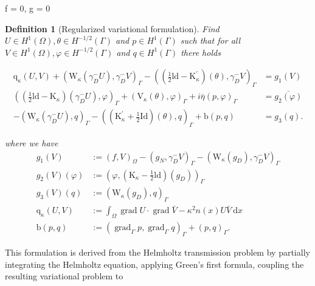 \documentclass[10pt,journal,compsoc, onecolumn]{IEEEtran}
\newtheorem{definition}[theorem]{Definition}
\begin{document}
f = 0, g = 0
\newpage
\begin{definition}[Regularized variational formulation]
    Find \(U \in H^{1}(\Omega), \theta \in H^{-1 / 2}(\Gamma)\) and \(p \in H^{1}(\Gamma)\) such that for all \(V \in H^{1}(\Omega), \varphi \in H^{-1 / 2}(\Gamma)\)
    and \(q \in H^{1}(\Gamma)\) there holds

    \begin{align}
        \mathrm{q}_{\kappa}(U, V)+\left(\mathrm{W}_{\kappa}\left(\gamma_{D}^{-} U\right), \gamma_{D}^{-} V\right)_{\Gamma}-\left((\frac{1}{2} \mathrm{ld}-\mathrm{K}_{\kappa}^{\prime})(\theta), \gamma_{D}^{-} V\right)_{\Gamma} &=g_1(V) \nonumber\\
        \left((\frac{1}{2} \mathrm{ld}-\mathrm{K}_{\kappa})\left(\gamma_{D}^{-} U\right), \varphi\right)_{\Gamma}+\left(\mathrm{V}_{\kappa}(\theta), \varphi\right)_{\Gamma}+i \overline{\eta}(p, \varphi)_{\Gamma} &=\overline{g_2(\varphi)} \label{eq:variational_formulation}\\
        -\left(\mathrm{W}_{\kappa}\left(\gamma_{D}^{-} U\right), q\right)_{\Gamma}-\left((\mathrm{K}_{\kappa}^{\prime}+\frac{1}{2} \mathrm{Id})(\theta), q\right)_{\Gamma}+\mathrm{b}(p, q) &=g_3(q). \nonumber
    \end{align}

    where we have 
    $$
    \begin{aligned} 
        g_1(V) &:=(f, V)_{\Omega}-\left(g_{N}, \gamma_{D}^{-} V\right)_{\Gamma}-\left(\mathrm{W}_{\kappa}\left(g_{D}\right), \gamma_{D}^{-} V\right)_{\Gamma} \\ 
        g_2(V)(\varphi) &:=\left(\varphi,\left(\mathrm{K}_{\kappa}-\frac{1}{2} \mathrm{ld}\right)\left(g_{D}\right)\right)_{\Gamma} \\ 
        g_3(V)(q) &:=\left(\mathrm{W}_{\kappa}\left(g_{D}\right), q\right)_{\Gamma} \\ 
        \mathrm{q}_{\kappa}(U, V)& :=\int_{\Omega} \operatorname{grad} U \cdot \operatorname{grad} \bar{V}-\kappa^{2} n({x}) U \bar{V} \mathrm{~d} {x} \\
        \mathrm{b}(p, q)& :=\left(\operatorname{grad}_{\Gamma} p, \operatorname{grad}_{\Gamma} q\right)_{\Gamma}+(p, q)_{\Gamma}.
    \end{aligned}
    $$

\end{definition}
This formulation is derived from the Helmholtz transmission problem by partially integrating the Helmholtz equation, 
applying Green's first formula, coupling the resulting variational problem to 
\end{document}
